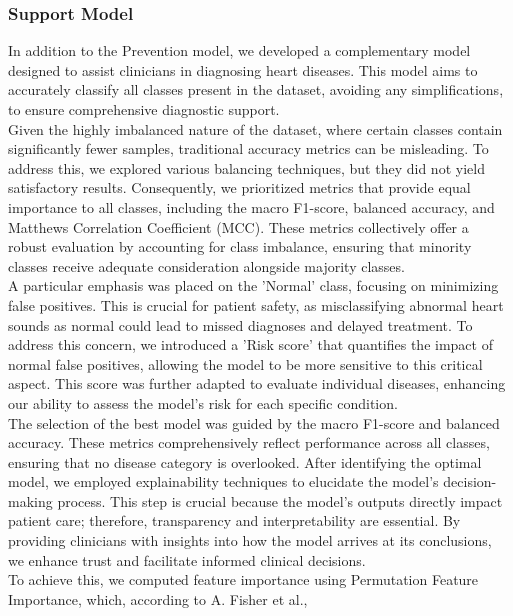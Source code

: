 \subsubsection*{Support Model}

In addition to the Prevention model, we developed a complementary model designed to assist clinicians in diagnosing heart diseases.
This model aims to accurately classify all classes present in the dataset, avoiding any simplifications, to ensure comprehensive diagnostic support.\\
Given the highly imbalanced nature of the dataset, where certain classes contain significantly fewer samples, traditional accuracy metrics can be misleading.
To address this, we explored various balancing techniques, but they did not yield satisfactory results.
Consequently, we prioritized metrics that provide equal importance to all classes, including the macro F1-score, balanced accuracy,
and Matthews Correlation Coefficient (MCC). These metrics collectively offer a robust evaluation by accounting for class imbalance,
ensuring that minority classes receive adequate consideration alongside majority classes.\\
A particular emphasis was placed on the 'Normal' class, focusing on minimizing false positives. This is crucial for patient safety,
as misclassifying abnormal heart sounds as normal could lead to missed diagnoses and delayed treatment.
To address this concern, we introduced a 'Risk score' that quantifies the impact of normal false positives, allowing
the model to be more sensitive to this critical aspect. This score was further adapted to evaluate individual diseases,
enhancing our ability to assess the model's risk for each specific condition.\\
The selection of the best model was guided by the macro F1-score and balanced accuracy.
These metrics comprehensively reflect performance across all classes, ensuring that no disease category is overlooked.
After identifying the optimal model, we employed explainability techniques to elucidate the model’s decision-making process.
This step is crucial because the model's outputs directly impact patient care; therefore, transparency and interpretability are essential.
By providing clinicians with insights into how the model arrives at its conclusions, we enhance trust and facilitate informed clinical decisions.\\
To achieve this, we computed feature importance using Permutation Feature Importance, which, according to A. Fisher et al.\cite{fisher2019modelswrongusefullearning},
